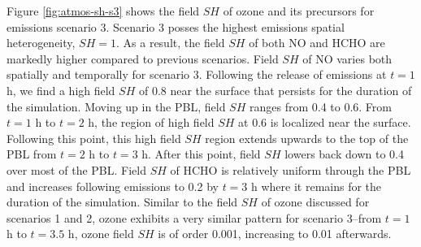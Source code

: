 Figure \ref{fig:atmos-sh-s3} shows the field $SH$ of ozone and its precursors for emissions scenario 3. Scenario 3 posses the highest emissions spatial heterogeneity, $SH=1$. As a result, the field $SH$ of both NO and HCHO are markedly higher compared to previous scenarios. Field $SH$ of NO varies both spatially and temporally for scenario 3. Following the release of emissions at $t=1$ h, we find a high field $SH$ of 0.8 near the surface that persists for the duration of the simulation. Moving up in the PBL, field $SH$ ranges from 0.4 to 0.6. From $t=1$ h to $t=2$ h, the region of high field $SH$ at 0.6 is localized near the surface. Following this point, this high field $SH$ region extends upwards to the top of the PBL from  $t=2$ h to $t=3$ h. After this point, field $SH$ lowers back down to 0.4 over most of the PBL. Field $SH$ of HCHO is relatively uniform through the PBL and increases following emissions to 0.2 by $t=3$ h where it remains for the duration of the simulation. Similar to the field $SH$ of ozone discussed for scenarios 1 and 2, ozone exhibits a very similar pattern for scenario 3--from $t=1$ h to $t=3.5$ h, ozone field $SH$ is of order 0.001, increasing to 0.01 afterwards.




  
